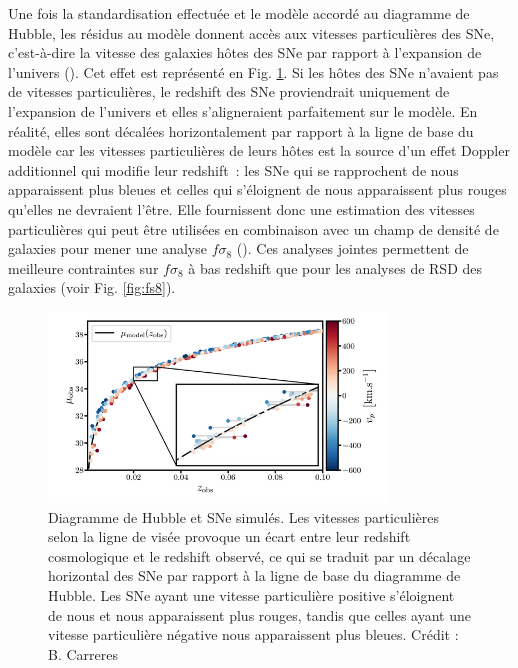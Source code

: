 \documentclass{book}
\begin{document}
Une fois la standardisation effectuée et le modèle accordé au diagramme de Hubble, les résidus au modèle donnent accès aux vitesses particulières des SNe, c’est-à-dire la vitesse des galaxies hôtes des SNe par rapport à l’expansion de l’univers (\cite{davis_effect_2011}). Cet effet est représenté en Fig. \ref{fig:residues}. Si les hôtes des SNe n’avaient pas de vitesses particulières, le redshift des SNe proviendrait uniquement de l’expansion de l’univers et elles s’aligneraient parfaitement sur le modèle. En réalité, elles sont décalées horizontalement par rapport à la ligne de base du modèle car les vitesses particulières de leurs hôtes est la source d’un effet Doppler additionnel qui modifie leur redshift~: les SNe qui se rapprochent de nous apparaissent plus bleues et celles qui s’éloignent de nous apparaissent plus rouges qu’elles ne devraient l’être. Elle fournissent donc une estimation des vitesses particulières qui peut être utilisées en combinaison avec un champ de densité de galaxies pour mener une analyse $f\sigma_8$ (\cite{boruah_bayesian_2022, stahl_peculiar-velocity_2021}). Ces analyses jointes permettent de meilleure contraintes sur $f\sigma_8$ à bas redshift que pour les analyses de RSD des galaxies (voir Fig. \ref{fig:fs8}).

\begin{figure}
    \centering
    \includegraphics[width=0.8\textwidth]{figures/Residues.png}
    \caption{Diagramme de Hubble et SNe simulés. Les vitesses particulières selon la ligne de visée provoque un écart entre leur redshift cosmologique et le redshift observé, ce qui se traduit par un décalage horizontal des SNe par rapport à la ligne de base du diagramme de Hubble. Les SNe ayant une vitesse particulière positive s'éloignent de nous et nous apparaissent plus rouges, tandis que celles ayant une vitesse particulière négative nous apparaissent plus bleues. Crédit : B. Carreres}
    \label{fig:residues}
\end{figure}
\end{document}
